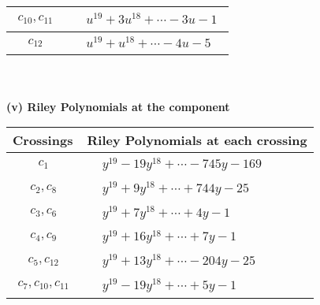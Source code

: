 \documentclass[1p]{elsarticle_modified}
\theoremstyle{definition}
\begin{document}
\begin{tabular}{m{50pt}|m{274pt}}
\hline $$\begin{aligned}c_{10},c_{11}\end{aligned}$$&$\begin{aligned}
&u^{19}+3 u^{18}+\cdots-3 u-1
\end{aligned}$\\
\hline $$\begin{aligned}c_{12}\end{aligned}$$&$\begin{aligned}
&u^{19}+u^{18}+\cdots-4 u-5
\end{aligned}$\\
\hline
\end{tabular}\\~\\
\newpage\renewcommand{\arraystretch}{1}
\flushleft \textbf{(v) Riley Polynomials at the component}\newline \\
\begin{tabular}{m{50pt}|m{274pt}}
Crossings & \hspace{64pt}Riley Polynomials at each crossing \\
\hline $$\begin{aligned}c_{1}\end{aligned}$$&$\begin{aligned}
&y^{19}-19 y^{18}+\cdots-745 y-169
\end{aligned}$\\
\hline $$\begin{aligned}c_{2},c_{8}\end{aligned}$$&$\begin{aligned}
&y^{19}+9 y^{18}+\cdots+744 y-25
\end{aligned}$\\
\hline $$\begin{aligned}c_{3},c_{6}\end{aligned}$$&$\begin{aligned}
&y^{19}+7 y^{18}+\cdots+4 y-1
\end{aligned}$\\
\hline $$\begin{aligned}c_{4},c_{9}\end{aligned}$$&$\begin{aligned}
&y^{19}+16 y^{18}+\cdots+7 y-1
\end{aligned}$\\
\hline $$\begin{aligned}c_{5},c_{12}\end{aligned}$$&$\begin{aligned}
&y^{19}+13 y^{18}+\cdots-204 y-25
\end{aligned}$\\
\hline $$\begin{aligned}c_{7},c_{10},c_{11}\end{aligned}$$&$\begin{aligned}
&y^{19}-19 y^{18}+\cdots+5 y-1
\end{aligned}$\\
\hline
\end{tabular}\\~\\
\end{document}
